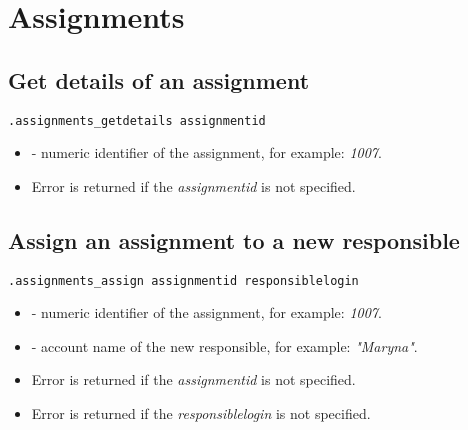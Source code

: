 \section{Assignments}

\subsection{Get details of an assignment}

\begin{lstlisting}[style=CommandLineStyle]
.assignments_getdetails assignmentid
\end{lstlisting}

\paramsheader
\begin{itemize}
\item {} - numeric identifier of the assignment, for example: \textit{1007}.
\end{itemize}

\errheader
\begin{itemize}
    \item Error  is returned if the \textit{assignmentid} is not specified.
\end{itemize}


\subsection{Assign an assignment to a new responsible}

\begin{lstlisting}[style=CommandLineStyle]
.assignments_assign assignmentid responsiblelogin
\end{lstlisting}

\paramsheader
\begin{itemize}
    \item {} - numeric identifier of the assignment, for example: \textit{1007}.
    \item {} - account name of the new responsible, for example: \textit{"Maryna"}.
\end{itemize}

\errheader
\begin{itemize}
    \item Error  is returned if the \textit{assignmentid} is not specified.
    \item Error  is returned if the \textit{responsiblelogin} is not specified.
\end{itemize}



